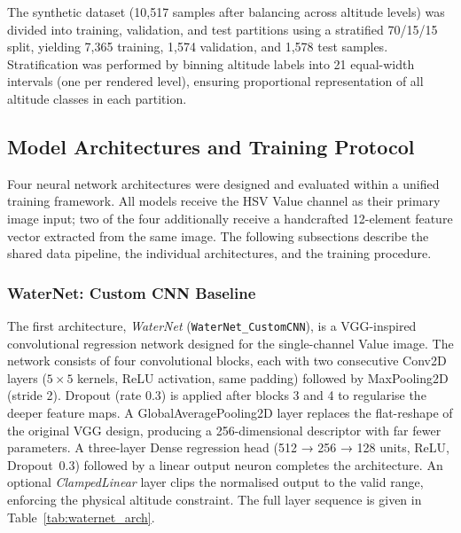 The synthetic dataset (10{,}517 samples after balancing across altitude levels) was divided into training, validation, and test partitions using a stratified 70/15/15 split, yielding 7{,}365 training, 1{,}574 validation, and 1{,}578 test samples. Stratification was performed by binning altitude labels into 21 equal-width intervals (one per rendered level), ensuring proportional representation of all altitude classes in each
partition.

\subsection{Model Architectures and Training Protocol}
\label{subsec:models}

Four neural network architectures were designed and evaluated within a unified training framework. All models receive the HSV Value channel as their primary image input; two of the four additionally receive a handcrafted 12-element feature vector extracted from the same image. The following subsections describe the shared data pipeline, the individual architectures, and the training procedure.



\subsubsection{WaterNet: Custom CNN Baseline}
\label{subsubsec:waternet}

The first architecture, \textit{WaterNet} (\texttt{WaterNet\_CustomCNN}), is a VGG-inspired~\cite{vgg16} convolutional regression network designed for the single-channel Value image. The network consists of four convolutional blocks, each with two consecutive Conv2D layers ($5\times5$ kernels, ReLU activation, same padding) followed by MaxPooling2D (stride 2). Dropout (rate 0.3) is applied after blocks 3 and 4 to regularise the deeper feature maps. A GlobalAveragePooling2D layer replaces the flat-reshape of the original VGG design, producing a 256-dimensional descriptor with far fewer parameters. A three-layer Dense regression head (512 → 256 → 128 units, ReLU, Dropout~0.3) followed by a linear output neuron completes the architecture. An optional \textit{ClampedLinear} layer clips the normalised output to the valid range, enforcing the physical altitude constraint. The full layer sequence is given in Table~\ref{tab:waternet_arch}.

